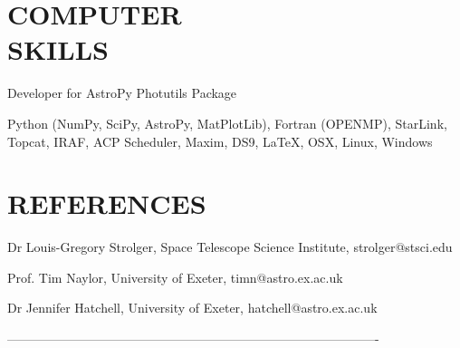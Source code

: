\documentclass[letter, margin, 10pt]{res} %
\begin{document}
\begin{resume}
\section{COMPUTER \\ SKILLS}

Developer for AstroPy Photutils Package

Python (NumPy, SciPy, AstroPy, MatPlotLib), Fortran (OPENMP), StarLink, Topcat, IRAF, ACP Scheduler, Maxim, DS9, \LaTeX, OSX, Linux, Windows


\section{REFERENCES} 

Dr Louis-Gregory Strolger, Space Telescope Science Institute, strolger@stsci.edu

Prof. Tim Naylor, University of Exeter, timn@astro.ex.ac.uk

Dr Jennifer Hatchell, University of Exeter, hatchell@astro.ex.ac.uk

 
----------------------------------------------------------------------------------------

\end{resume}
\end{document}
